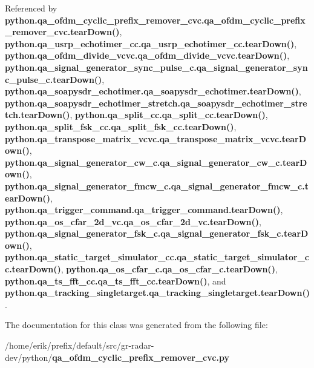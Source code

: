 Referenced by {\bf python.\+qa\+\_\+ofdm\+\_\+cyclic\+\_\+prefix\+\_\+remover\+\_\+cvc.\+qa\+\_\+ofdm\+\_\+cyclic\+\_\+prefix\+\_\+remover\+\_\+cvc.\+tear\+Down()}, {\bf python.\+qa\+\_\+usrp\+\_\+echotimer\+\_\+cc.\+qa\+\_\+usrp\+\_\+echotimer\+\_\+cc.\+tear\+Down()}, {\bf python.\+qa\+\_\+ofdm\+\_\+divide\+\_\+vcvc.\+qa\+\_\+ofdm\+\_\+divide\+\_\+vcvc.\+tear\+Down()}, {\bf python.\+qa\+\_\+signal\+\_\+generator\+\_\+sync\+\_\+pulse\+\_\+c.\+qa\+\_\+signal\+\_\+generator\+\_\+sync\+\_\+pulse\+\_\+c.\+tear\+Down()}, {\bf python.\+qa\+\_\+soapysdr\+\_\+echotimer.\+qa\+\_\+soapysdr\+\_\+echotimer.\+tear\+Down()}, {\bf python.\+qa\+\_\+soapysdr\+\_\+echotimer\+\_\+stretch.\+qa\+\_\+soapysdr\+\_\+echotimer\+\_\+stretch.\+tear\+Down()}, {\bf python.\+qa\+\_\+split\+\_\+cc.\+qa\+\_\+split\+\_\+cc.\+tear\+Down()}, {\bf python.\+qa\+\_\+split\+\_\+fsk\+\_\+cc.\+qa\+\_\+split\+\_\+fsk\+\_\+cc.\+tear\+Down()}, {\bf python.\+qa\+\_\+transpose\+\_\+matrix\+\_\+vcvc.\+qa\+\_\+transpose\+\_\+matrix\+\_\+vcvc.\+tear\+Down()}, {\bf python.\+qa\+\_\+signal\+\_\+generator\+\_\+cw\+\_\+c.\+qa\+\_\+signal\+\_\+generator\+\_\+cw\+\_\+c.\+tear\+Down()}, {\bf python.\+qa\+\_\+signal\+\_\+generator\+\_\+fmcw\+\_\+c.\+qa\+\_\+signal\+\_\+generator\+\_\+fmcw\+\_\+c.\+tear\+Down()}, {\bf python.\+qa\+\_\+trigger\+\_\+command.\+qa\+\_\+trigger\+\_\+command.\+tear\+Down()}, {\bf python.\+qa\+\_\+os\+\_\+cfar\+\_\+2d\+\_\+vc.\+qa\+\_\+os\+\_\+cfar\+\_\+2d\+\_\+vc.\+tear\+Down()}, {\bf python.\+qa\+\_\+signal\+\_\+generator\+\_\+fsk\+\_\+c.\+qa\+\_\+signal\+\_\+generator\+\_\+fsk\+\_\+c.\+tear\+Down()}, {\bf python.\+qa\+\_\+static\+\_\+target\+\_\+simulator\+\_\+cc.\+qa\+\_\+static\+\_\+target\+\_\+simulator\+\_\+cc.\+tear\+Down()}, {\bf python.\+qa\+\_\+os\+\_\+cfar\+\_\+c.\+qa\+\_\+os\+\_\+cfar\+\_\+c.\+tear\+Down()}, {\bf python.\+qa\+\_\+ts\+\_\+fft\+\_\+cc.\+qa\+\_\+ts\+\_\+fft\+\_\+cc.\+tear\+Down()}, and {\bf python.\+qa\+\_\+tracking\+\_\+singletarget.\+qa\+\_\+tracking\+\_\+singletarget.\+tear\+Down()}.



The documentation for this class was generated from the following file\+:\begin{DoxyCompactItemize}
\item 
/home/erik/prefix/default/src/gr-\/radar-\/dev/python/{\bf qa\+\_\+ofdm\+\_\+cyclic\+\_\+prefix\+\_\+remover\+\_\+cvc.\+py}\end{DoxyCompactItemize}
